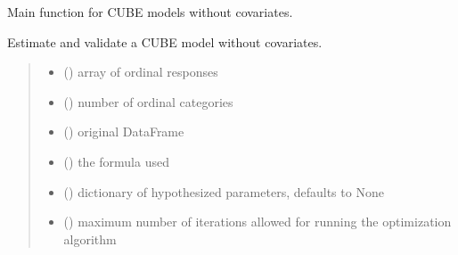 \documentclass[letterpaper,10pt,english]{sphinxmanual}
\begin{document}
\begin{fulllineitems}
\label{\detokenize{cubmods:cubmods.cube.mle}}
\pysigstartsignatures
{}
\pysigstopsignatures
\sphinxAtStartPar
Main function for CUBE models without covariates.

\sphinxAtStartPar
Estimate and validate a CUBE model without covariates.
\begin{quote}\begin{description}
\begin{itemize}
\item {} 
\sphinxAtStartPar
{} () \textendash{} array of ordinal responses

\item {} 
\sphinxAtStartPar
{} () \textendash{} number of ordinal categories

\item {} 
\sphinxAtStartPar
{} () \textendash{} original DataFrame

\item {} 
\sphinxAtStartPar
{} () \textendash{} the formula used

\item {} 
\sphinxAtStartPar
{} (\sphinxstyleliteralemphasis{\sphinxupquote{, }}) \textendash{} dictionary of hypothesized parameters, defaults to None

\item {} 
\sphinxAtStartPar
{} () \textendash{} maximum number of iterations allowed for running the optimization algorithm


\end{itemize}
\end{description}
\end{quote}
\end{fulllineitems}
\end{document}
